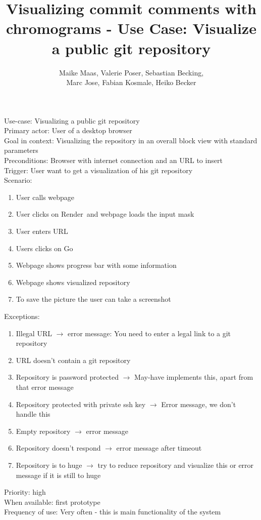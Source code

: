 \documentclass[11pt]{scrartcl}
\author{Maike Maas, Valerie Poser, Sebastian Becking,\\
Marc Jose, Fabian Kosmale, Heiko Becker}
\title{Visualizing commit comments with chromograms - Use Case: Visualize a public git repository}
\begin{document}
\maketitle


Use-case: Visualizing a public git repository \\
Primary actor: User of a desktop browser \\
Goal in context: Visualizing the repository in an overall block view with standard parameters \\
Preconditions: Browser with internet connection and an URL to insert \\
Trigger: User want to get a visualization of his git repository \\

Scenario:
\begin{enumerate}
\item User calls webpage
\item User clicks on \grqq Render\grqq ~and webpage loads the input mask
\item User enters URL
\item Users clicks on \grqq Go\grqq
\item Webpage shows progress bar with some information
\item Webpage shows visualized repository 
\item To save the picture the user can take a screenshot
\end{enumerate}

Exceptions:
\begin{enumerate}
\item Illegal URL $\rightarrow$ error message: \glqq You need to enter a legal link to a git repository\grqq
\item URL doesn't contain a git repository
\item Repository is password protected $\rightarrow$ May-have implements this, apart from that error message 
\item Repository protected with private ssh key $\rightarrow$ Error message, we don't handle this
\item Empty repository $\rightarrow$ error message
\item Repository doesn't respond $\rightarrow$ error message after timeout
\item Repository is to huge $\rightarrow$  try to reduce repository and visualize this or error message if it is still to huge
\end{enumerate}

Priority: high \\
When available: first prototype\\
Frequency of use: Very often - this is main functionality of the system\\
\end{document}
